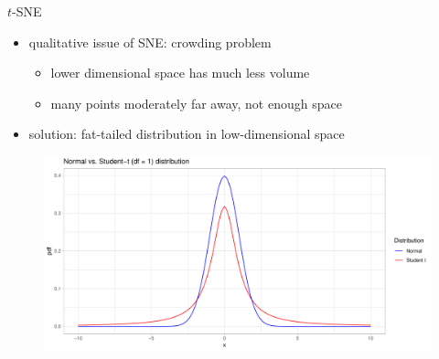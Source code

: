 \documentclass{beamer}
\begin{document}
\begin{frame}[fragile]{$t$-SNE}
    \begin{itemize}
        \item qualitative issue of SNE: crowding problem
            \begin{itemize}
                \item lower dimensional space has much less volume
                \item many points moderately far away, not enough space
            \end{itemize}
        \item solution: fat-tailed distribution in low-dimensional space
    \end{itemize}

    \begin{figure}[h]
        \centering
        \includegraphics[height=.5\textheight]{t_vs_norm}
    \end{figure}
\end{frame}
\end{document}
